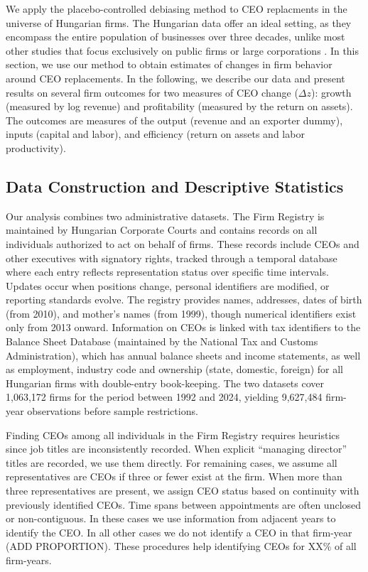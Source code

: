 \documentclass[11pt,a4paper]{article}
\begin{document}
We apply the placebo-controlled debiasing method to CEO replacments in the universe of Hungarian firms. The Hungarian data offer an ideal setting, as they encompass the entire population of businesses over three decades, unlike most other studies that focus exclusively on public firms or large corporations \citep{Bertrand2003-io, crossland2011differences, quigley2015has}. In this section, we use our method to obtain estimates of changes in firm behavior around CEO replacements. In the following, we describe our data and present results on several firm outcomes for two measures of CEO change ($\Delta z$): growth (measured by log revenue) and profitability (measured by the return on assets). The outcomes are measures of the output (revenue and an exporter dummy), inputs (capital and labor), and efficiency (return on assets and labor productivity).

\subsection{Data Construction and Descriptive Statistics}

Our analysis combines two administrative datasets. The Firm Registry is maintained by Hungarian Corporate Courts and contains records on all individuals authorized to act on behalf of firms. These records include CEOs and other executives with signatory rights, tracked through a temporal database where each entry reflects representation status over specific time intervals. Updates occur when positions change, personal identifiers are modified, or reporting standards evolve. The registry provides names, addresses, dates of birth (from 2010), and mother’s names (from 1999), though numerical identifiers exist only from 2013 onward. Information on CEOs is linked with tax identifiers to the Balance Sheet Database (maintained by the National Tax and Customs Administration), which has annual balance sheets and income statements, as well as employment, industry code and ownership (state, domestic, foreign) for all Hungarian firms with double-entry book-keeping. The two datasets cover 1,063,172 firms for the period between 1992 and 2024, yielding 9,627,484 firm-year observations before sample restrictions.

Finding CEOs among all individuals in the Firm Registry requires heuristics since job titles are inconsistently recorded. When explicit “managing director” titles are recorded, we use them directly. For remaining cases, we assume all representatives are CEOs if three or fewer exist at the firm. When more than three representatives are present, we assign CEO status based on continuity with previously identified CEOs. Time spans between appointments are often unclosed or non-contiguous. In these cases we use information from adjacent years to identify the CEO. In all other cases we do not identify a CEO in that firm-year (ADD PROPORTION). These procedures help identifying CEOs for XX\% of all firm-years.
\end{document}

